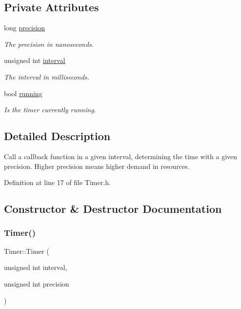 \subsection*{Private Attributes}
\begin{DoxyCompactItemize}
\item 
long \hyperlink{class_timer_a0eb4723e5856ae2180081af68980d1dc}{precision}
\begin{DoxyCompactList}\small\item\em The precision in nanoseconds. \end{DoxyCompactList}\item 
unsigned int \hyperlink{class_timer_aaf9bce1286b714658a0f4484d8fee960}{interval}
\begin{DoxyCompactList}\small\item\em The interval in milliseconds. \end{DoxyCompactList}\item 
bool \hyperlink{class_timer_a3b8bb57a0a252c88f85c0592715ea425}{running}
\begin{DoxyCompactList}\small\item\em Is the timer currently running. \end{DoxyCompactList}\end{DoxyCompactItemize}


\subsection{Detailed Description}
Call a callback function in a given interval, determining the time with a given precision. Higher precision means higher demand in resources. 

Definition at line 17 of file Timer.\+h.



\subsection{Constructor \& Destructor Documentation}
\mbox{\label{class_timer_a5b659c4fb572c549dad183a7b32b08df}} 
\subsubsection{\texorpdfstring{Timer()}{Timer()}}
{\footnotesize\ttfamily Timer\+::\+Timer (\begin{DoxyParamCaption}\item[{unsigned int}]{interval,  }\item[{unsigned int}]{precision }\end{DoxyParamCaption})}


